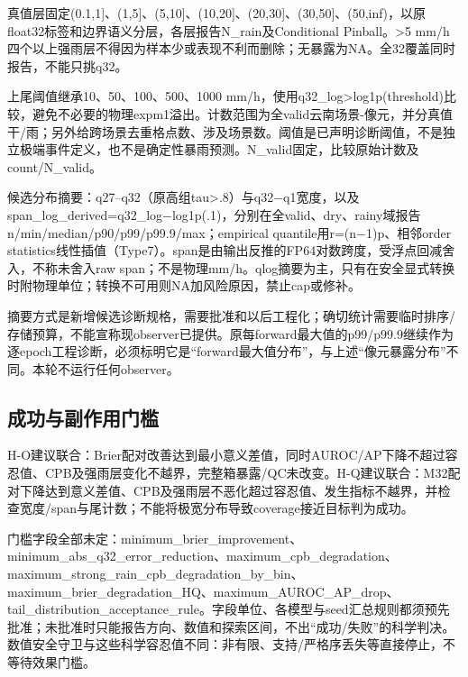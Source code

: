 \documentclass[UTF8,fontset=fandol,10pt]{ctexart}
\begin{document}
真值层固定(0.1,1]、(1,5]、(5,10]、(10,20]、(20,30]、(30,50]、(50,inf)，以原float32标签和边界语义分层，各层报告N\_\allowbreak{}rain及Conditional Pinball。>5 mm/\allowbreak{}h四个以上强雨层不得因为样本少或表现不利而删除；无暴露为NA。全32覆盖同时报告，不能只挑q32。

上尾阈值继承10、50、100、500、1000 mm/\allowbreak{}h，使用q32\_\allowbreak{}log>log1p(threshold)比较，避免不必要的物理expm1溢出。计数范围为全valid云南场景-像元，并分真值干/\allowbreak{}雨；另外给跨场景去重格点数、涉及场景数。阈值是已声明诊断阈值，不是独立极端事件定义，也不是确定性暴雨预测。N\_\allowbreak{}valid固定，比较原始计数及count/\allowbreak{}N\_\allowbreak{}valid。

候选分布摘要：q27–q32（原高组tau>.8）与q32\(-\)q1宽度，以及span\_\allowbreak{}log\_\allowbreak{}derived=q32\_\allowbreak{}log\(-\)log1p(.1)，分别在全valid、dry、rainy域报告n/\allowbreak{}min/\allowbreak{}median/\allowbreak{}p90/\allowbreak{}p99/\allowbreak{}p99.9/\allowbreak{}max；empirical quantile用r=(n\(-\)1)p、相邻order statistics线性插值（Type7）。span是由输出反推的FP64对数跨度，受浮点回减舍入，不称未舍入raw span；不是物理mm/\allowbreak{}h。qlog摘要为主，只有在安全显式转换时附物理单位；转换不可用则NA加风险原因，禁止cap或修补。

摘要方式是新增候选诊断规格，需要批准和以后工程化；确切统计需要临时排序/\allowbreak{}存储预算，不能宣称现observer已提供。原每forward最大值的p99/\allowbreak{}p99.9继续作为逐epoch工程诊断，必须标明它是“forward最大值分布”，与上述“像元暴露分布”不同。本轮不运行任何observer。

\subsection{成功与副作用门槛}

H-O建议联合：Brier配对改善达到最小意义差值，同时AUROC/\allowbreak{}AP下降不超过容忍值、CPB及强雨层变化不越界，完整箱暴露/\allowbreak{}QC未改变。H-Q建议联合：M32配对下降达到意义差值、CPB及强雨层不恶化超过容忍值、发生指标不越界，并检查宽度/\allowbreak{}span与尾计数；不能将极宽分布导致coverage接近目标判为成功。

门槛字段全部未定：minimum\_\allowbreak{}brier\_\allowbreak{}improvement、minimum\_\allowbreak{}abs\_\allowbreak{}q32\_\allowbreak{}error\_\allowbreak{}reduction、maximum\_\allowbreak{}cpb\_\allowbreak{}degradation、maximum\_\allowbreak{}strong\_\allowbreak{}rain\_\allowbreak{}cpb\_\allowbreak{}degradation\_\allowbreak{}by\_\allowbreak{}bin、maximum\_\allowbreak{}brier\_\allowbreak{}degradation\_\allowbreak{}HQ、maximum\_\allowbreak{}AUROC\_\allowbreak{}AP\_\allowbreak{}drop、tail\_\allowbreak{}distribution\_\allowbreak{}acceptance\_\allowbreak{}rule。字段单位、各模型与seed汇总规则都须预先批准；未批准时只能报告方向、数值和探索区间，不出“成功/\allowbreak{}失败”的科学判决。数值安全守卫与这些科学容忍值不同：非有限、支持/\allowbreak{}严格序丢失等直接停止，不等待效果门槛。
\end{document}
